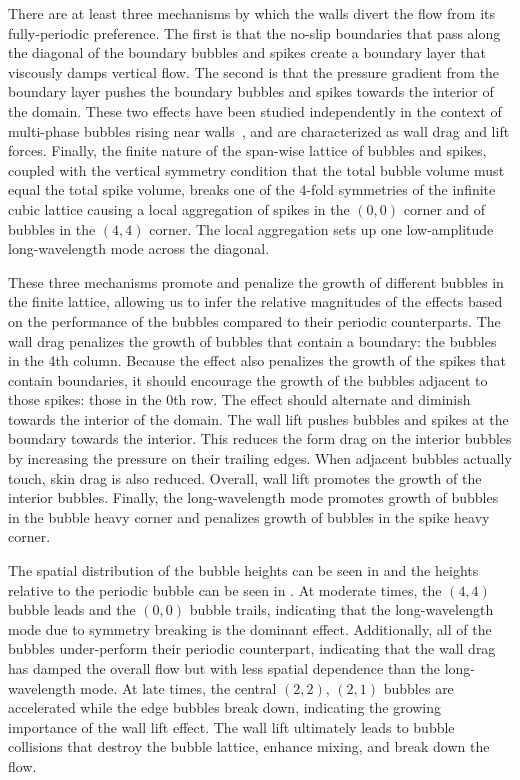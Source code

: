 There are at least three mechanisms by which the walls divert the flow from its fully-periodic preference.
The first is that the no-slip boundaries that pass along the diagonal of the boundary bubbles and spikes create a boundary layer that viscously damps vertical flow.
The second is that the pressure gradient from the boundary layer pushes the boundary bubbles and spikes towards the interior of the domain.
These two effects have been studied independently in the context of multi-phase bubbles rising near walls~\cite{Takemura2002}, and are characterized as wall drag and lift forces.
Finally, the finite nature of the span-wise lattice of bubbles and spikes, coupled with the vertical symmetry condition that the total bubble volume must equal the total spike volume, breaks one of the 4-fold symmetries of the infinite cubic lattice causing a local aggregation of spikes in the $(0,0)$ corner and of bubbles in the $(4,4)$ corner.
The local aggregation sets up one low-amplitude long-wavelength mode across the diagonal.

These three mechanisms promote and penalize the growth of different bubbles in the finite lattice, allowing us to infer the relative magnitudes of the effects based on the performance of the bubbles compared to their periodic counterparts.
The wall drag penalizes the growth of bubbles that contain a boundary: the bubbles in the 4th column.
Because the effect also penalizes the growth of the spikes that contain boundaries, it should encourage the growth of the bubbles adjacent to those spikes: those in the 0th row.
The effect should alternate and diminish towards the interior of the domain.
The wall lift pushes bubbles and spikes at the boundary towards the interior.
This reduces the form drag on the interior bubbles by increasing the pressure on their trailing edges.
When adjacent bubbles actually touch, skin drag is also reduced.
Overall, wall lift promotes the growth of the interior bubbles.
Finally, the long-wavelength mode promotes growth of bubbles in the bubble heavy corner and penalizes growth of bubbles in the spike heavy corner.

The spatial distribution of the bubble heights can be seen in  and the heights relative to the periodic bubble can be seen in .
At moderate times, the $(4,4)$ bubble leads and the $(0,0)$ bubble trails, indicating that the long-wavelength mode due to symmetry breaking is the dominant effect.
Additionally, all of the bubbles under-perform their periodic counterpart, indicating that the wall drag has damped the overall flow but with less spatial dependence than the long-wavelength mode.
At late times, the central $(2,2)$, $(2,1)$  bubbles are accelerated while the edge bubbles break down, indicating the growing importance of the wall lift effect.
The wall lift ultimately leads to bubble collisions that destroy the bubble lattice, enhance mixing, and break down the flow.

